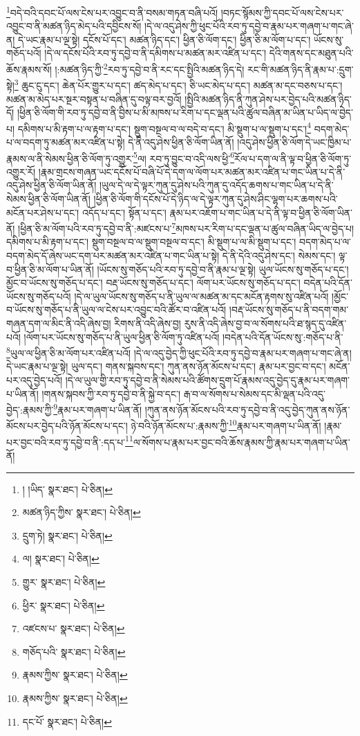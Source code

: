 \footnote{། །ཡིད་  སྣར་ཐང་།  པེ་ཅིན། }བདེ་བའི་དབང་པོ་ལས་ངེས་པར་འབྱུང་བ་ནི་བསམ་གཏན་བཞི་པའོ། །བཏང་སྙོམས་ཀྱི་དབང་པོ་ལས་ངེས་པར་འབྱུང་བ་ནི་མཚན་ཉིད་མེད་པའི་དབྱིངས་སོ། །དེ་ལ་འདུ་ཤེས་ཀྱི་ཕུང་པོའི་རབ་ཏུ་དབྱེ་བ་རྣམ་པར་གཞག་པ་གང་ཞེ་ན། དེ་ཡང་རྣམ་པ་ལྔ་སྟེ། དངོས་པོ་དང་། མཚན་ཉིད་དང་། ཕྱིན་ཅི་ལོག་དང་། ཕྱིན་ཅི་མ་ལོག་པ་དང་། ཡོངས་སུ་གཅོད་པའོ། །དེ་ལ་དངོས་པོའི་རབ་ཏུ་དབྱེ་བ་ནི་དམིགས་པ་མཚན་མར་འཛིན་པ་དང་། དེའི་གནས་དང་མཐུན་པའི་ཆོས་རྣམས་སོ། །:མཚན་ཉིད་ཀྱི་\footnote{མཚན་ཉིད་ཀྱིས་  སྣར་ཐང་།  པེ་ཅིན། }རབ་ཏུ་དབྱེ་བ་ནི་རང་དང་སྤྱིའི་མཚན་ཉིད་དེ། རང་གི་མཚན་ཉིད་ནི་རྣམ་པ་:དྲུག་སྟེ།\footnote{དྲུག་ཏེ།  སྣར་ཐང་།  པེ་ཅིན། } ཆུང་ངུ་དང་། ཆེན་པོར་གྱུར་པ་དང་། ཚད་མེད་པ་དང་། ཅི་ཡང་མེད་པ་དང་། མཚན་མ་དང་བཅས་པ་དང་། མཚན་མ་མེད་པར་སྔར་བསྟན་པ་བཞིན་དུ་བལྟ་བར་བྱའོ། །སྤྱིའི་མཚན་ཉིད་ནི་ཀུན་ཤེས་པར་བྱེད་པའི་མཚན་ཉིད་དོ། །ཕྱིན་ཅི་ལོག་གི་རབ་ཏུ་དབྱེ་བ་ནི་བྱིས་པ་མི་མཁས་པ་རིག་པ་དང་ལྡན་པའི་ཚུལ་བཞིན་མ་ཡིན་པ་ཡིད་ལ་བྱེད་པ། དམིགས་པ་མི་རྟག་པ་ལ་རྟག་པ་དང་། སྡུག་བསྔལ་བ་ལ་བདེ་བ་དང་། མི་སྡུག་པ་ལ་སྡུག་པ་དང་།\footnote{ལ།  སྣར་ཐང་།  པེ་ཅིན། } བདག་མེད་པ་ལ་བདག་ཏུ་མཚན་མར་འཛིན་པ་སྟེ། དེ་ནི་འདུ་ཤེས་ཕྱིན་ཅི་ལོག་ཡིན་ནོ། །འདུ་ཤེས་ཕྱིན་ཅི་ལོག་དེ་ཡང་ཁྱིམ་པ་རྣམས་ལ་ནི་སེམས་ཕྱིན་ཅི་ལོག་ཏུ་འགྱུར་\footnote{གྱུར་  སྣར་ཐང་།  པེ་ཅིན། }ལ། རབ་ཏུ་བྱུང་བ་འདི་ལས་ཕྱི་\footnote{ཕྱིར་  སྣར་ཐང་།  པེ་ཅིན། }རོལ་པ་དག་ལ་ནི་ལྟ་བ་ཕྱིན་ཅི་ལོག་ཏུ་འགྱུར་རོ། །རྣམ་གྲངས་གཞན་ཡང་དངོས་པོ་བཞི་པོ་དེ་དག་ལ་ལོག་པར་མཚན་མར་འཛིན་པ་གང་ཡིན་པ་དེ་ནི་འདུ་ཤེས་ཕྱིན་ཅི་ལོག་ཡིན་ནོ། །ཡུལ་དེ་ལ་དེ་ལྟར་ཀུན་དུ་ཤེས་པའི་ཀུན་དུ་འདོད་ཆགས་པ་གང་ཡིན་པ་དེ་ནི་སེམས་ཕྱིན་ཅི་ལོག་ཡིན་ནོ། །ཕྱིན་ཅི་ལོག་གི་དངོས་པོ་དེ་ཉིད་ལ་དེ་ལྟར་ཀུན་དུ་ཤེས་ཤིང་ལྷག་པར་ཆགས་པའི་མངོན་པར་ཤེས་པ་དང་། འདོད་པ་དང་། སྟོན་པ་དང་། རྣམ་པར་འཇོག་པ་གང་ཡིན་པ་དེ་ནི་ལྟ་བ་ཕྱིན་ཅི་ལོག་ཡིན་ནོ། །ཕྱིན་ཅི་མ་ལོག་པའི་རབ་ཏུ་དབྱེ་བ་ནི་:མཛངས་པ་\footnote{འཛངས་པ་  སྣར་ཐང་།  པེ་ཅིན། }མཁས་པར་རིག་པ་དང་ལྡན་པ་ཚུལ་བཞིན་ཡིད་ལ་བྱེད་པ། དམིགས་པ་མི་རྟག་པ་དང་། སྡུག་བསྔལ་བ་ལ་སྡུག་བསྔལ་བ་དང་། མི་སྡུག་པ་ལ་མི་སྡུག་པ་དང་། བདག་མེད་པ་ལ་བདག་མེད་དོ་ཞེས་ཡང་དག་པར་མཚན་མར་འཛིན་པ་གང་ཡིན་པ་སྟེ། དེ་ནི་དེའི་འདུ་ཤེས་དང་། སེམས་དང་། ལྟ་བ་ཕྱིན་ཅི་མ་ལོག་པ་ཡིན་ནོ། །ཡོངས་སུ་གཅོད་པའི་རབ་ཏུ་དབྱེ་བ་ནི་རྣམ་པ་ལྔ་སྟེ། ཡུལ་ཡོངས་སུ་གཅོད་པ་དང་། མྱོང་བ་ཡོངས་སུ་གཅོད་པ་དང་། བརྡ་ཡོངས་སུ་གཅོད་པ་དང་། ལོག་པར་ཡོངས་སུ་གཅོད་པ་དང་། བདེན་པའི་དོན་ཡོངས་སུ་གཅོད་པའོ། །དེ་ལ་ཡུལ་ཡོངས་སུ་གཅོད་པ་ནི་ཡུལ་ལ་མཚན་མ་དང་མངོན་རྟགས་སུ་འཛིན་པའོ། །མྱོང་བ་ཡོངས་སུ་གཅོད་པ་ནི་ཡུལ་ལ་ངེས་པར་འབྱུང་བའི་ཚོར་བ་འཛིན་པའོ། །བརྡ་ཡོངས་སུ་གཅོད་པ་ནི་བདག་གམ་གཞན་དག་ལ་མིང་ནི་འདི་ཞེས་བྱ། རིགས་ནི་འདི་ཞེས་བྱ། རུས་ནི་འདི་ཞེས་བྱ་བ་ལ་སོགས་པའི་ཐ་སྙད་དུ་འཛིན་པའོ། །ལོག་པར་ཡོངས་སུ་གཅོད་པ་ནི་ཡུལ་ཕྱིན་ཅི་ལོག་ཏུ་འཛིན་པའོ། །བདེན་པའི་དོན་ཡོངས་སུ་:གཅོད་པ་ནི་\footnote{གཅོད་པའི་  སྣར་ཐང་།  པེ་ཅིན། }ཡུལ་ལ་ཕྱིན་ཅི་མ་ལོག་པར་འཛིན་པའོ། །དེ་ལ་འདུ་བྱེད་ཀྱི་ཕུང་པོའི་རབ་ཏུ་དབྱེ་བ་རྣམ་པར་གཞག་པ་གང་ཞེ་ན། དེ་ཡང་རྣམ་པ་ལྔ་སྟེ། ཡུལ་དང་། གནས་སྐབས་དང་། ཀུན་ནས་ཉོན་མོངས་པ་དང་། རྣམ་པར་བྱང་བ་དང་། མངོན་པར་འདུ་བྱེད་པའོ། །དེ་ལ་ཡུལ་གྱི་རབ་ཏུ་དབྱེ་བ་ནི་སེམས་པའི་ཚོགས་དྲུག་པོ་རྣམས་འདུ་བྱེད་དུ་རྣམ་པར་གཞག་པ་ཡིན་ནོ། །གནས་སྐབས་ཀྱི་རབ་ཏུ་དབྱེ་བ་ནི་སྐྱེ་བ་དང་། རྒ་བ་ལ་སོགས་པ་སེམས་དང་མི་ལྡན་པའི་འདུ་བྱེད་:རྣམས་ཀྱི་\footnote{རྣམས་ཀྱིས་  སྣར་ཐང་།  པེ་ཅིན། }རྣམ་པར་གཞག་པ་ཡིན་ནོ། །ཀུན་ནས་ཉོན་མོངས་པའི་རབ་ཏུ་དབྱེ་བ་ནི་འདུ་བྱེད་ཀུན་ནས་ཉོན་མོངས་པར་བྱེད་པའི་ཉོན་མོངས་པ་དང་། ཉེ་བའི་ཉོན་མོངས་པ་:རྣམས་ཀྱི་\footnote{རྣམས་ཀྱིས་  སྣར་ཐང་།  པེ་ཅིན། }རྣམ་པར་གཞག་པ་ཡིན་ནོ། །རྣམ་པར་བྱང་བའི་རབ་ཏུ་དབྱེ་བ་ནི་:དད་པ་\footnote{དང་པོ་  སྣར་ཐང་།  པེ་ཅིན། }ལ་སོགས་པ་རྣམ་པར་བྱང་བའི་ཆོས་རྣམས་ཀྱི་རྣམ་པར་གཞག་པ་ཡིན་ནོ། 